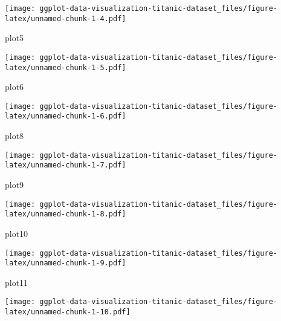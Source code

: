 \documentclass[
]{article}
\newenvironment{Shaded}{\begin{snugshade}}{\end{snugshade}}
\newcommand{\NormalTok}[1]{#1}
\begin{document}
\texttt{[image: ggplot-data-visualization-titanic-dataset\_files/figure-latex/unnamed-chunk-1-4.pdf]}

\begin{Shaded}
\begin{Highlighting}[]
\NormalTok{plot5}
\end{Highlighting}
\end{Shaded}

\texttt{[image: ggplot-data-visualization-titanic-dataset\_files/figure-latex/unnamed-chunk-1-5.pdf]}

\begin{Shaded}
\begin{Highlighting}[]
\NormalTok{plot6}
\end{Highlighting}
\end{Shaded}

\texttt{[image: ggplot-data-visualization-titanic-dataset\_files/figure-latex/unnamed-chunk-1-6.pdf]}

\begin{Shaded}
\begin{Highlighting}[]
\NormalTok{plot8}
\end{Highlighting}
\end{Shaded}

\texttt{[image: ggplot-data-visualization-titanic-dataset\_files/figure-latex/unnamed-chunk-1-7.pdf]}

\begin{Shaded}
\begin{Highlighting}[]
\NormalTok{plot9}
\end{Highlighting}
\end{Shaded}

\texttt{[image: ggplot-data-visualization-titanic-dataset\_files/figure-latex/unnamed-chunk-1-8.pdf]}

\begin{Shaded}
\begin{Highlighting}[]
\NormalTok{plot10}
\end{Highlighting}
\end{Shaded}

\texttt{[image: ggplot-data-visualization-titanic-dataset\_files/figure-latex/unnamed-chunk-1-9.pdf]}

\begin{Shaded}
\begin{Highlighting}[]
\NormalTok{plot11}
\end{Highlighting}
\end{Shaded}

\texttt{[image: ggplot-data-visualization-titanic-dataset\_files/figure-latex/unnamed-chunk-1-10.pdf]}
\end{document}

